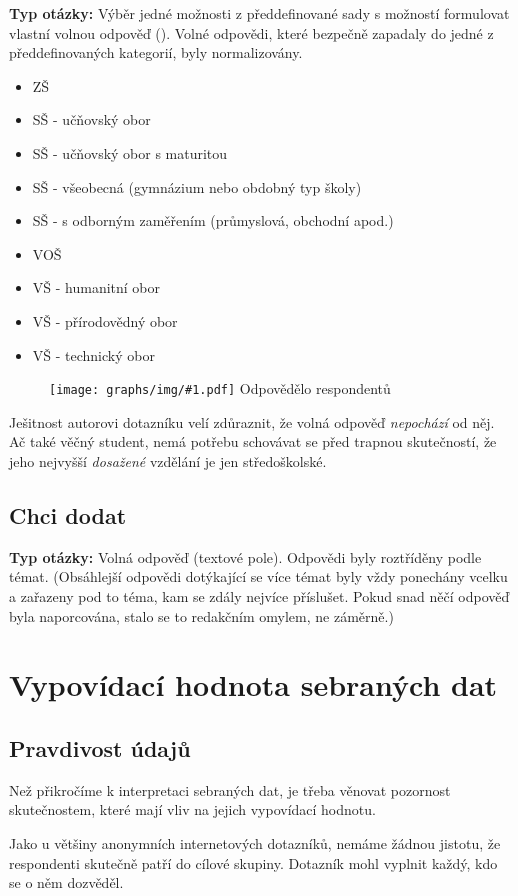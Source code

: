 \documentclass[12pt, a4paper, twoside]{article}
\newcommand{\answercount}[1]{Odpovědělo  respondentů}
\newcommand{\includegraph}[2]{
  \begin{figure}[H]
    \centering
    \textbf{#2}
    \texttt{[image: graphs/img/\#1.pdf]}
    \answercount{#1}
  \end{figure}
}
\newcommand{\qtype}{\textbf{Typ otázky:}
}
\newcommand{\pickOne}{Výběr jedné možnosti z předdefinované sady\xspace}
\newcommand{\withOther}{s možností formulovat vlastní volnou odpověď (\uv{Jiné})\xspace}
\newcommand{\freeEntry}{Volná odpověď (textové pole)}
\begin{document}
\qtype \pickOne \withOther.
Volné odpovědi, které bezpečně zapadaly do jedné z předdefinovaných
kategorií, byly normalizovány.

\begin{itemize}
\item ZŠ
\item SŠ - učňovský obor
\item SŠ - učňovský obor s maturitou
\item SŠ - všeobecná (gymnázium nebo obdobný typ školy)
\item SŠ - s odborným zaměřením (průmyslová, obchodní apod.)
\item VOŠ
\item VŠ - humanitní obor
\item VŠ - přírodovědný obor
\item VŠ - technický obor
\end{itemize}

\includegraph{moje_nejvyssi_dosazene_vzdelani}{}

{\footnotesize
Ješitnost autorovi dotazníku velí zdůraznit, že volná
odpověď  \emph{nepochází} od něj.
Ač také věčný student, nemá potřebu schovávat se před
trapnou skutečností, že jeho nejvyšší \emph{dosažené} vzdělání
je jen středoškolské.
}

\subsection{Chci dodat}

\qtype \freeEntry.
Odpovědi byly roztříděny podle témat. (Obsáhlejší odpovědi
dotýkající se více témat byly vždy ponechány vcelku
a zařazeny pod to téma, kam se zdály nejvíce příslušet.
Pokud snad něčí odpověď byla naporcována, stalo se to redakčním
omylem, ne záměrně.)



\section{Vypovídací hodnota sebraných dat}

\subsection{Pravdivost údajů}

Než přikročíme k interpretaci sebraných dat, je třeba věnovat
pozornost skutečnostem, které mají vliv na jejich vypovídací
hodnotu.

Jako u většiny anonymních internetových dotazníků,
nemáme žádnou jistotu, že respondenti skutečně patří do cílové
skupiny. Dotazník mohl vyplnit každý, kdo se o něm dozvěděl.
\end{document}
